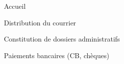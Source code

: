 \documentclass[9pt,a4paper,academicons]{altacv}
\begin{document}
\divider

\begin{cvlistdescription}
    \item Accueil
    \item Distribution du courrier
    \item Constitution de dossiers administratifs
    \item Paiements bancaires (CB, chèques)
\end{cvlistdescription}




\newpage
\end{document}
